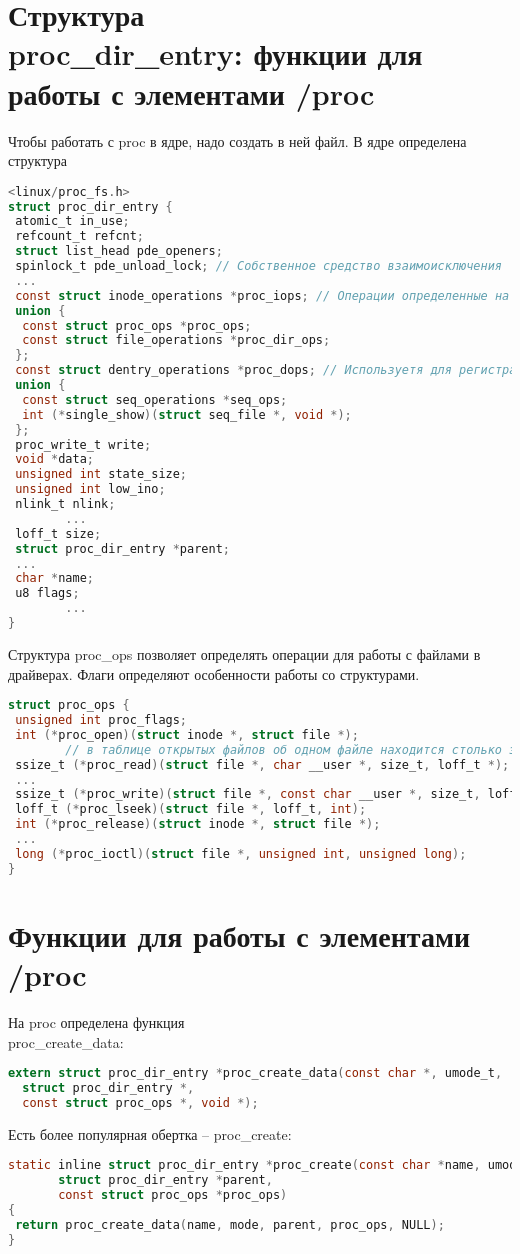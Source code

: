 \section{Структура \\ proc\_dir\_entry: функции для работы с элементами /proc}
Чтобы работать с proc в ядре, надо создать в ней файл.
В ядре определена структура
\begin{lstlisting}[language=C, label=lst:1, caption= Структура proc\_dir\_entry]
<linux/proc_fs.h>
struct proc_dir_entry {
 atomic_t in_use;
 refcount_t refcnt;
 struct list_head pde_openers; 
 spinlock_t pde_unload_lock; // Собственное средство взаимоисключения
 ...
 const struct inode_operations *proc_iops; // Операции определенные на inode фс proc
 union {
  const struct proc_ops *proc_ops;
  const struct file_operations *proc_dir_ops;
 };
 const struct dentry_operations *proc_dops; // Используетя для регистрации своих операций над файлом в proc
 union {
  const struct seq_operations *seq_ops;
  int (*single_show)(struct seq_file *, void *);
 };
 proc_write_t write;
 void *data;
 unsigned int state_size;
 unsigned int low_ino;
 nlink_t nlink;
        ...
 loff_t size;
 struct proc_dir_entry *parent;
 ...
 char *name;
 u8 flags;
        ...
} 
\end{lstlisting}
Структура proc\_ops позволяет определять операции для работы с файлами в драйверах. Флаги определяют особенности работы со структурами.
\begin{lstlisting}[language=C, label=lst:1, caption= Структура proc\_ops]
struct proc_ops {
 unsigned int proc_flags;
 int (*proc_open)(struct inode *, struct file *);
        // в таблице открытых файлов об одном файле находится столько записей, сколько раз он был открыт
 ssize_t (*proc_read)(struct file *, char __user *, size_t, loff_t *);
 ...
 ssize_t (*proc_write)(struct file *, const char __user *, size_t, loff_t *);
 loff_t (*proc_lseek)(struct file *, loff_t, int);
 int (*proc_release)(struct inode *, struct file *);
 ...
 long (*proc_ioctl)(struct file *, unsigned int, unsigned long);
}
\end{lstlisting}

\section{Функции для работы с элементами /proc}

На proc определена функция \\ proc\_create\_data:
\begin{lstlisting}[language=C, label=lst:1, caption= Функция proc\_create\_data]
extern struct proc_dir_entry *proc_create_data(const char *, umode_t,
  struct proc_dir_entry *,
  const struct proc_ops *, void *);
\end{lstlisting}
Есть более популярная обертка -- proc\_create:
\begin{lstlisting}[language=C, label=lst:1, caption= Функция proc\_create]
static inline struct proc_dir_entry *proc_create(const char *name, umode_t mode,
       struct proc_dir_entry *parent,
       const struct proc_ops *proc_ops)
{
 return proc_create_data(name, mode, parent, proc_ops, NULL);
}
\end{lstlisting}

